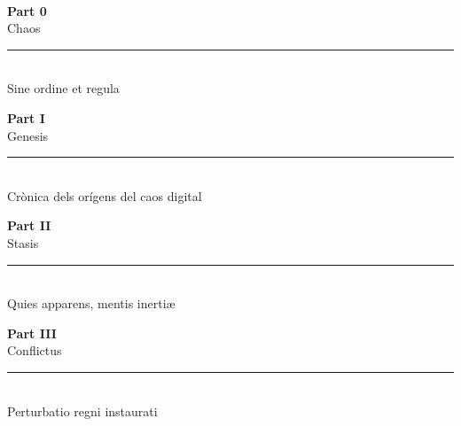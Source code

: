 \documentclass[12pt, a5paper, twoside]{book}
\let\cleardoublepage\clearpage %
\begin{document}

\begin{titlepage}
\thispagestyle{empty}
\vfill
~
\end{titlepage}
\cleardoublepage



\cleardoublepage
\thispagestyle{empty}
\vspace*{\fill}
\begin{center}
    {\normalfont\huge\bfseries Part 0}\\[0.5cm]
    {\Huge Chaos}\\[1ex]
    \rule[0.5ex]{5cm}{0.5pt}\\[1ex]
    {\small Sine ordine et regula}
\end{center}
\vspace*{\fill}
\cleardoublepage



\cleardoublepage
\thispagestyle{empty}
\vspace*{\fill}
\begin{center}
    {\normalfont\huge\bfseries Part I}\\[0.5cm]
    {\Huge Genesis}\\[1ex]
    \rule[0.5ex]{5cm}{0.5pt}\\[1ex]
    {\small Crònica dels orígens del caos digital}
\end{center}
\vspace*{\fill}
\cleardoublepage



\cleardoublepage
\thispagestyle{empty}
\vspace*{\fill}
\begin{center}
    {\normalfont\huge\bfseries Part II}\\[0.5cm]
    {\Huge Stasis}\\[1ex]
    \rule[0.5ex]{5cm}{0.5pt}\\[1ex]
    {\small Quies apparens, mentis inertiæ}
\end{center}
\vspace*{\fill}
\cleardoublepage



\cleardoublepage
\thispagestyle{empty}
\vspace*{\fill}
\begin{center}
    {\normalfont\huge\bfseries Part III}\\[0.5cm]
    {\Huge Conflictus}\\[1ex]
    \rule[0.5ex]{5cm}{0.5pt}\\[1ex]
    {\small Perturbatio regni instaurati}
\end{center}
\vspace*{\fill}
\cleardoublepage
\end{document}
